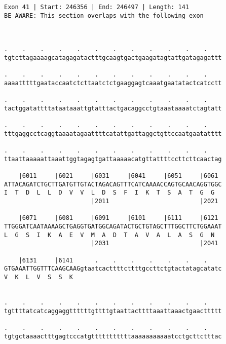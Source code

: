 \documentclass{article}
\begin{document}
\begin{Verbatim}
Exon 41 | Start: 246356 | End: 246497 | Length: 141
BE AWARE: This section overlaps with the following exon



.    .    .    .    .    .    .    .    .    .    .    .    
tgtcttagaaaagcatagagatactttgcaagtgactgaagatagtattgatagagattt
                                                            
.    .    .    .    .    .    .    .    .    .    .    .    
aaaatttttgaataccaatctcttaatctctgaaggagtcaaatgaatatactcatcctt
                                                            
.    .    .    .    .    .    .    .    .    .    .    .    
tactggatattttataataaattgtatttactgacaggcctgtaaataaaatctagtatt
                                                            
.    .    .    .    .    .    .    .    .    .    .    .    
tttgaggcctcaggtaaaatagaattttcatattgattaggctgttccaatgaatatttt
                                                            
.    .    .    .    .    .    .    .    .    .    .    .    
ttaattaaaaattaaattggtagagtgattaaaaacatgttattttccttcttcaactag
                                                            
    |6011     |6021     |6031     |6041     |6051     |6061 
ATTACAGATCTGCTTGATGTTGTACTAGACAGTTTCATCAAAACCAGTGCAACAGGTGGC
I  T  D  L  L  D  V  V  L  D  S  F  I  K  T  S  A  T  G  G  
                        |2011                         |2021 
  
    |6071     |6081     |6091     |6101     |6111     |6121 
TTGGGATCAATAAAAGCTGAGGTGATGGCAGATACTGCTGTAGCTTTGGCTTCTGGAAAT
L  G  S  I  K  A  E  V  M  A  D  T  A  V  A  L  A  S  G  N  
                        |2031                         |2041 
  
    |6131     |6141      .    .    .    .    .    .    .    
GTGAAATTGGTTTCAAGCAAGgtaatcacttttcttttgccttctgtactatagcatatc
V  K  L  V  S  S  K                                         
                                                            
  
.    .    .    .    .    .    .    .    .    .    .    .    
tgttttatcatcaggaggttttttgttttgtaattacttttaaattaaactgaacttttt
                                                            
.    .    .    .    .    .    .    .    .    .    .    .    
tgtgctaaaactttgagtcccatgtttttttttttaaaaaaaaaaatcctgcttctttac
                                                            

\end{Verbatim}
\end{document}
